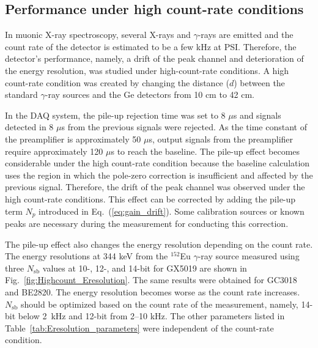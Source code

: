 \subsection{Performance under high count-rate conditions}
\label{sec:highcountrate}

In muonic X-ray spectroscopy, several X-rays and $\gamma$-rays are emitted and the count rate of the detector is estimated to be a few kHz at PSI.
Therefore, the detector's performance, namely, a drift of the peak channel and deterioration of the energy resolution, was studied under high-count-rate conditions. %
A high count-rate condition was created 
by changing the distance ($d$) between the standard $\gamma$-ray sources and the Ge detectors from 10 cm to 42 cm.

In the DAQ system, the pile-up rejection time was set to 8 $\mu$s and signals detected in 8 $\mu$s from the previous signals were rejected.
As the time constant of the preamplifier is approximately 50 $\mu$s, 
output signals from the preamplifier require approximately 120 $\mu$s to reach the baseline. %
The pile-up effect becomes considerable under the high count-rate condition 
because the baseline calculation uses the region in which the pole-zero correction is insufficient and affected by the previous signal.
Therefore, the drift of the peak channel was observed under the high count-rate conditions.
This effect can be corrected by adding the pile-up term $N_p$ introduced in Eq.~(\ref{eq:gain_drift}).
Some calibration sources or known peaks are necessary during the measurement for conducting this correction.

The pile-up effect also changes the energy resolution depending on the count rate.
The energy resolutions at 344 keV from the $^{152}$Eu $\gamma$-ray source measured using three $N_\mathrm{sb}$ values at 10-, 12-, and 14-bit for GX5019 are shown in Fig.~\ref{fig:Highcount_Eresolution}. 
The same results were obtained for GC3018 and BE2820. 
The energy resolution becomes worse as the count rate increases.
$N_\mathrm{sb}$ should be optimized based on the count rate of the measurement, namely, 14-bit below 2~kHz and 12-bit from 2--10 kHz. 
The other parameters listed in Table~\ref{tab:Eresolution_parameters} were independent of the count-rate condition.

